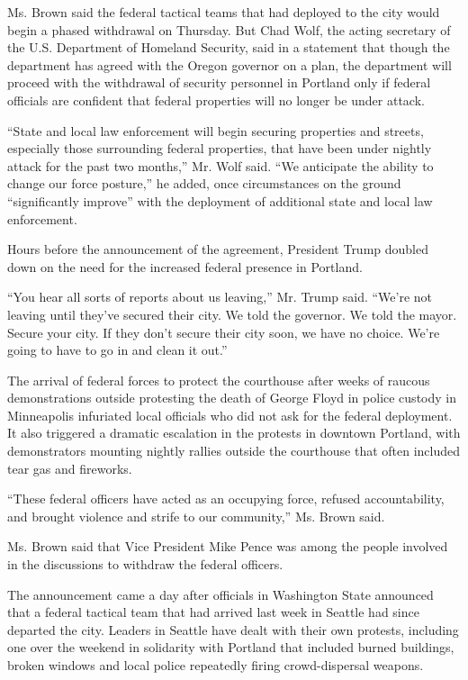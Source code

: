 Ms. Brown said the federal tactical teams that had deployed to the city
would begin a phased withdrawal on Thursday. But Chad Wolf, the acting
secretary of the U.S. Department of Homeland Security, said in a
statement that though the department has agreed with the Oregon governor
on a plan, the department will proceed with the withdrawal of security
personnel in Portland only if federal officials are confident that
federal properties will no longer be under attack.

``State and local law enforcement will begin securing properties and
streets, especially those surrounding federal properties, that have been
under nightly attack for the past two months,'' Mr. Wolf said. ``We
anticipate the ability to change our force posture,'' he added, once
circumstances on the ground ``significantly improve'' with the
deployment of additional state and local law enforcement.

Hours before the announcement of the agreement, President Trump doubled
down on the need for the increased federal presence in Portland.

``You hear all sorts of reports about us leaving,'' Mr. Trump said.
``We're not leaving until they've secured their city. We told the
governor. We told the mayor. Secure your city. If they don't secure
their city soon, we have no choice. We're going to have to go in and
clean it out.''

The arrival of federal forces to protect the courthouse after weeks of
raucous demonstrations outside protesting the death of George Floyd in
police custody in Minneapolis infuriated local officials who did not ask
for the federal deployment. It also triggered a dramatic escalation in
the protests in downtown Portland, with demonstrators mounting nightly
rallies outside the courthouse that often included tear gas and
fireworks.

``These federal officers have acted as an occupying force, refused
accountability, and brought violence and strife to our community,'' Ms.
Brown said.

Ms. Brown said that Vice President Mike Pence was among the people
involved in the discussions to withdraw the federal officers.

The announcement came a day after officials in Washington State
announced that a federal tactical team that had arrived last week in
Seattle had since departed the city. Leaders in Seattle have dealt with
their own protests, including one over the weekend in solidarity with
Portland that included burned buildings, broken windows and local police
repeatedly firing crowd-dispersal weapons.

